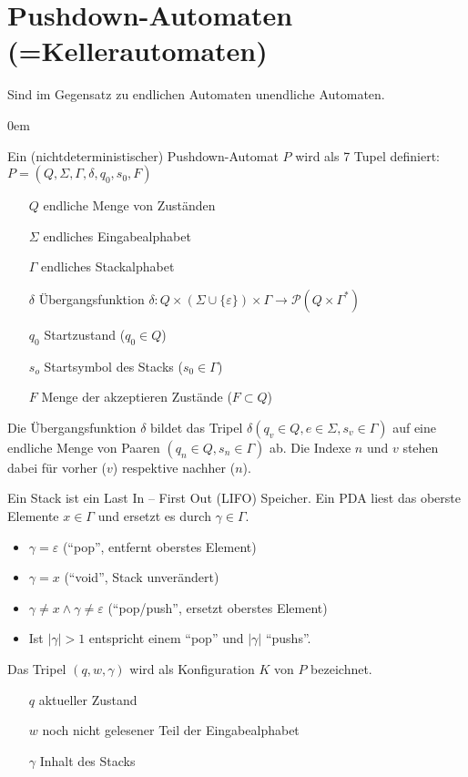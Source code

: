 \section{Pushdown-Automaten (=Kellerautomaten)}
Sind im Gegensatz zu endlichen Automaten unendliche Automaten.
\begin{description}\itemsep0em
	\item [Pushdown-Automat (PDA)] 
	Ein (nichtdeterministischer) Pushdown-Automat $P$ wird als 7 Tupel definiert: $P = (Q, \Sigma, \Gamma, \delta, q_0, s_0, F)$
	\begin{itemize}\itemsep0em
		\item [$Q$] endliche Menge von Zuständen
		\item [$\Sigma$] endliches Eingabealphabet
		\item [$\Gamma$] endliches Stackalphabet
		\item [$\delta$] Übergangsfunktion $\delta \colon Q \times (\Sigma \cup \{ \varepsilon \} ) \times \Gamma \rightarrow \mathcal P(Q \times \Gamma^{*})$
		\item [$q_0$] Startzustand ($q_0 \in Q$)
		\item [$s_o$] Startsymbol des Stacks ($s_0 \in \Gamma$) 
		\item [$F$] Menge der akzeptieren Zustände ($F \subset Q$)
	\end{itemize}

	Die Übergangsfunktion $\delta$ bildet das Tripel $\delta(q_v \in Q, e \in \Sigma, s_v \in \Gamma)$  auf eine endliche Menge von Paaren $(q_n \in Q, s_n \in \Gamma)$ ab. Die Indexe $n$ und $v$ stehen dabei für vorher ($v$) respektive nachher ($n$).

	\item [Stack]
	Ein Stack ist ein Last In -- First Out (LIFO) Speicher. Ein PDA liest das oberste Elemente $x \in \Gamma$ und ersetzt es durch $\gamma \in \Gamma$.
	\begin{itemize}\itemsep0em
		\item $\gamma = \varepsilon$ (\enquote{pop}, entfernt oberstes Element)
		\item $\gamma = x$ (\enquote{void}, Stack unverändert)
		\item $\gamma \neq x \wedge \gamma \neq \varepsilon$ (\enquote{pop/push}, ersetzt oberstes Element)
		\item Ist $|\gamma| > 1$ entspricht einem \enquote{pop} und $|\gamma|$ \enquote{pushs}.
	\end{itemize}

	\item [Konfiguration] Das Tripel $(q, w, \gamma)$ wird als Konfiguration $K$ von $P$ bezeichnet.
	\begin{itemize}\itemsep0em
		\item [$q$] aktueller Zustand
		\item [$w$] noch nicht gelesener Teil der Eingabealphabet
		\item [$\gamma$] Inhalt des Stacks
	\end{itemize}


\end{description}

